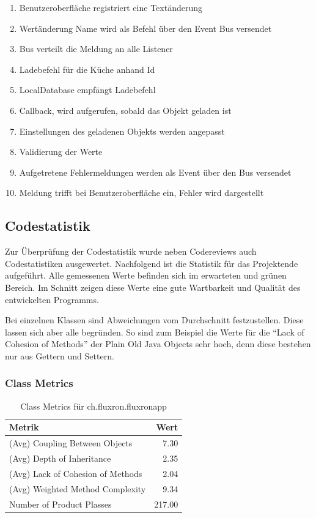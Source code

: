 \begin{enumerate}
\item{Benutzeroberfläche registriert eine Textänderung}
\item{Wertänderung Name wird als Befehl über den Event Bus versendet}
\item{Bus verteilt die Meldung an alle Listener}
\item{Ladebefehl für die Küche anhand Id}
\item{LocalDatabase empfängt Ladebefehl}
\item{Callback, wird aufgerufen, sobald das Objekt geladen ist}
\item{Einstellungen des geladenen Objekts werden angepasst}
\item{Validierung der Werte}
\item{Aufgetretene Fehlermeldungen werden als Event über den Bus versendet}
\item{Meldung trifft bei Benutzeroberfläche ein, Fehler wird dargestellt}
\end{enumerate}

\subsection{Codestatistik}

Zur Überprüfung der Codestatistik wurde neben Codereviews auch Codestatistiken ausgewertet. Nachfolgend ist die Statistik für das Projektende aufgeführt. Alle gemessenen Werte befinden sich im erwarteten und grünen Bereich. Im Schnitt zeigen diese Werte eine gute Wartbarkeit und Qualität des entwickelten Programms.

Bei einzelnen Klassen sind Abweichungen vom Durchschnitt festzustellen. Diese lassen sich aber alle begründen. So sind zum Beispiel die Werte für die \enquote{Lack of Cohesion of Methods} der Plain Old Java Objects sehr hoch, denn diese bestehen nur aus Gettern und Settern.

\subsubsection{Class Metrics}

\begin{table}[H]
	\begin{center}
	  \begin{tabular}{ | l | r | }
	    \hline
	    \textbf{Metrik} & \textbf{Wert} \\ \hline
	    (Avg) Coupling Between Objects & 7.30\\ \hline
   	    (Avg) Depth of Inheritance & 2.35 \\ \hline
   	    (Avg) Lack of Cohesion of Methods & 2.04 \\ \hline
  	    (Avg) Weighted Method Complexity & 9.34 \\ \hline
  	    Number of Product Plasses & 217.00 \\ \hline
	  \end{tabular}
	  \caption{Class Metrics für ch.fluxron.fluxronapp}
  \end{center}
\end{table}

